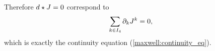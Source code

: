 Therefore $d \star J =0$ correspond to
\begin{equation}
\label{SA:4.33}
\sum_{k \in I_{4}} \partial_{k}J^{k} =0,
\end{equation}
which is exactly the continuity equation (\ref{maxwell:continuity_eq}).





